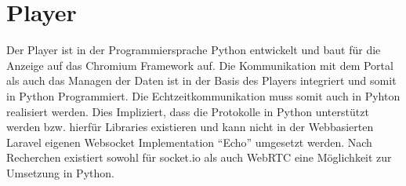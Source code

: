 \section{Player}
\label{sec:In Player}
Der Player ist in der Programmiersprache Python entwickelt und baut für die Anzeige auf das Chromium Framework auf. Die Kommunikation mit dem Portal als auch das Managen der Daten ist in der Basis des Players integriert und somit in Python Programmiert. Die Echtzeitkommunikation muss somit auch in Pyhton realisiert werden. Dies Impliziert, dass die Protokolle in Python unterstützt werden bzw. hierfür Libraries existieren und kann nicht in der Webbasierten Laravel eigenen Websocket Implementation "`Echo"' umgesetzt werden. Nach Recherchen existiert sowohl für socket.io als auch WebRTC eine Möglichkeit zur Umsetzung in Python.

